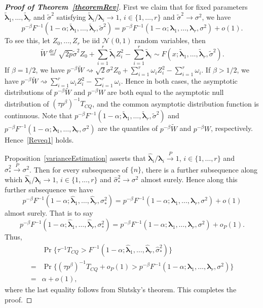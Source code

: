\documentclass[times,sort&compress,3p]{elsarticle}
\newcommand{\bfsym}[1]{\ensuremath{\boldsymbol{#1}}}
\def\blambda {\bfsym {\lambda}}        \def\bLambda {\bfsym {\Lambda}}
\theoremstyle{plain}
\theoremstyle{definition}
\theoremstyle{remark}
\begin{document}
\begin{appendices}
\begin{proof}[\textbf{Proof of Theorem~\ref{theoremRev}}]
    First we claim that for fixed parameters $\tilde{\blambda}_1,\ldots, \tilde{\blambda}_r$ and $\tilde{\sigma}^2$ satisfying $\tilde{\blambda}_i/\blambda_i\to 1$, $i\in\{1,\ldots,r\}$ and $\tilde{\sigma}^2\to \sigma^2$, we have
    \begin{equation}\label{Reveq1}
        p^{-\beta}F^{-1}(1-\alpha;\tilde{\blambda}_1,\ldots,\tilde{\blambda}_r,\tilde{\sigma}^2)=
        p^{-\beta}F^{-1}(1-\alpha;\blambda_1,\ldots,\blambda_r,\sigma^2)+o(1).
    \end{equation}
    To see this, let $Z_0,\ldots, Z_r$ be iid $\mathcal{N}(0,1)$ random variables, then
    $$
    \tilde{W}\overset{def}{=}\sqrt{2p}\tilde{\sigma}^2 Z_0
+
        \sum_{i=1}^r \tilde{\blambda}_i Z_i^2
            -
        \sum_{i=1}^r \tilde{\blambda}_i\sim F(x;\tilde{\blambda}_1,\ldots,\tilde{\blambda}_r,\tilde{\sigma}^2).
    $$
If $\beta=1/2$, we have
$
    p^{-\beta}\tilde{W}\rightsquigarrow
\sqrt{2}\sigma^2 Z_0 + \sum_{i=1}^r \omega_i Z_i^2 -\sum_{i=1}^r \omega_i
$.
If $\beta>1/2$, we have
$
    p^{-\beta}\tilde{W}\rightsquigarrow
\sum_{i=1}^r \omega_i Z_i^2 -\sum_{i=1}^r \omega_i.
$
    Hence in both cases, the asymptotic distributions of $p^{-\beta}\tilde{W}$ and $p^{-\beta}W$ are both equal to the asymptotic null distribution of $(\tau p^{\beta})^{-1}T_{CQ}$, and the common asymptotic distribution function is continuous.
Note that
$
        p^{-\beta}F^{-1}(1-\alpha;\tilde{\blambda}_1,\ldots,\tilde{\blambda}_r,\tilde{\sigma}^2)
    $
     and
$
        p^{-\beta}F^{-1}(1-\alpha;\blambda_1,\ldots,\blambda_r,\sigma^2)
    $
    are the quantiles of $p^{-\beta}\tilde{W}$ and $p^{-\beta}W$, respectively.
    Hence~\eqref{Reveq1} holds. 
    
    Proposition~\ref{varianceEstimation} asserts that $\hat{\blambda}_i/\blambda_i\xrightarrow{P} 1$, $i\in\{1,\ldots,r\}$ and $\hat{\sigma}_*^2\xrightarrow{P} \sigma^2$.
    Then for every subsequence of $\{n\}$, there is a further subsequence along which $\hat{\blambda}_i/\blambda_i\to 1$, $i\in\{1,\ldots,r\}$ and $\hat{\sigma}_*^2\to \sigma^2$ almost surely.
    Hence along this further subsequence we have
    $$
        p^{-\beta}F^{-1}(1-\alpha;\hat{\blambda}_1,\ldots,\hat{\blambda}_r,\sigma_{*}^2)=
        p^{-\beta}F^{-1}(1-\alpha;\blambda_1,\ldots,\blambda_r,\sigma^2)+o(1)
    $$
    almost surely.
    That is to say
    $$
        p^{-\beta}F^{-1}(1-\alpha;\hat{\blambda}_1,\ldots,\hat{\blambda}_r,\sigma_{*}^2)=
        p^{-\beta}F^{-1}(1-\alpha;\blambda_1,\ldots,\blambda_r,\sigma^2)+o_P(1).
    $$
    Thus,
\begin{align*}
    &\Pr\{\tau^{-1}T_{CQ} > F^{-1}(1-\alpha;\hat{\blambda}_1,\ldots,\hat{\blambda}_r,\hat{\sigma}_*^2)\}
    \\
    =&
    \Pr\{(\tau p^{\beta})^{-1}T_{CQ} +o_P(1) > p^{-\beta}F^{-1}(1-\alpha;\blambda_1,\ldots,\blambda_r,\sigma^2)\}
    \\
    =& \alpha +o(1),
\end{align*}
    where the last equality follows from Slutsky's theorem.
    This completes the proof.
\end{proof}





\end{appendices}
\end{document}

